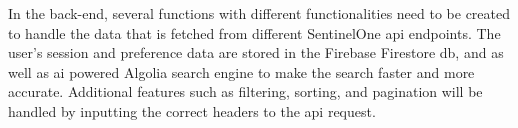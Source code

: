 

In the back-end, several functions with different functionalities need to be created to handle the data that is fetched from different
SentinelOne \acrshort{api} endpoints. The user's session and preference data are stored in the Firebase Firestore \acrshort{db}, and as
well as \acrshort{ai} powered Algolia search engine to make the search faster and more accurate. Additional features such as filtering,
sorting, and pagination will be handled by inputting the correct headers to the \acrshort{api} request.

